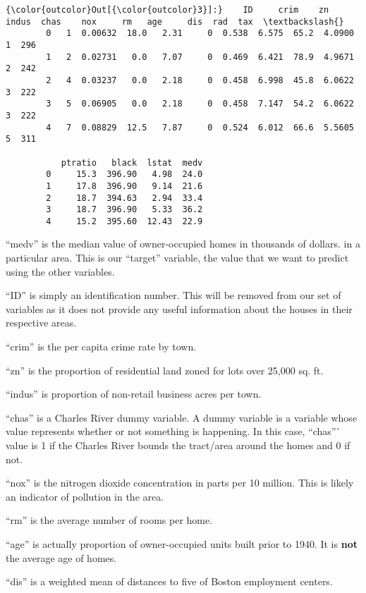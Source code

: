 \documentclass[11pt]{article}
\begin{document}
\begin{Verbatim}[commandchars=\\\{\}]
{\color{outcolor}Out[{\color{outcolor}3}]:}    ID     crim    zn  indus  chas    nox     rm   age     dis  rad  tax  \textbackslash{}
        0   1  0.00632  18.0   2.31     0  0.538  6.575  65.2  4.0900    1  296   
        1   2  0.02731   0.0   7.07     0  0.469  6.421  78.9  4.9671    2  242   
        2   4  0.03237   0.0   2.18     0  0.458  6.998  45.8  6.0622    3  222   
        3   5  0.06905   0.0   2.18     0  0.458  7.147  54.2  6.0622    3  222   
        4   7  0.08829  12.5   7.87     0  0.524  6.012  66.6  5.5605    5  311   
        
           ptratio   black  lstat  medv  
        0     15.3  396.90   4.98  24.0  
        1     17.8  396.90   9.14  21.6  
        2     18.7  394.63   2.94  33.4  
        3     18.7  396.90   5.33  36.2  
        4     15.2  395.60  12.43  22.9  
\end{Verbatim}
            
    ``medv'' is the median value of owner-occupied homes in thousands of
dollars. in a particular area. This is our ``target'' variable, the
value that we want to predict using the other variables.

``ID'' is simply an identification number. This will be removed from our
set of variables as it does not provide any useful information about the
houses in their respective areas.

``crim'' is the per capita crime rate by town.

``zn'' is the proportion of residential land zoned for lots over 25,000
sq. ft.

``indus'' is proportion of non-retail business acres per town.

``chas'' is a Charles River dummy variable. A dummy variable is a
variable whose value represents whether or not something is happening.
In this case, ``chas''' value is 1 if the Charles River bounds the
tract/area around the homes and 0 if not.

``nox'' is the nitrogen dioxide concentration in parts per 10 million.
This is likely an indicator of pollution in the area.

``rm'' is the average number of rooms per home.

``age'' is actually proportion of owner-occupied units built prior to
1940. It is \textbf{not} the average age of homes.

``dis'' is a weighted mean of distances to five of Boston employment
centers.
\end{document}
